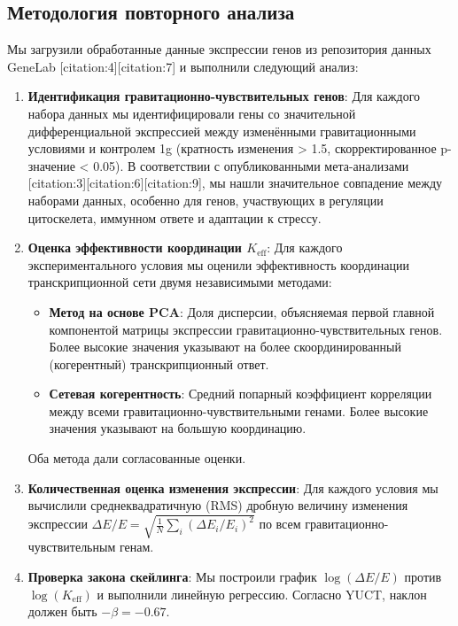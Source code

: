 \documentclass[12pt,a4paper]{article}
\theoremstyle{remark}
\newcommand{\Keff}{K_{\mathrm{eff}}}
\begin{document}
	\subsection{Методология повторного анализа}
	
	Мы загрузили обработанные данные экспрессии генов из репозитория данных GeneLab [citation:4][citation:7] и выполнили следующий анализ:
	
	\begin{enumerate}
		\item \textbf{Идентификация гравитационно-чувствительных генов}: Для каждого набора данных мы идентифицировали гены со значительной дифференциальной экспрессией между изменёнными гравитационными условиями и контролем 1g (кратность изменения > 1.5, скорректированное p-значение < 0.05). В соответствии с опубликованными мета-анализами [citation:3][citation:6][citation:9], мы нашли значительное совпадение между наборами данных, особенно для генов, участвующих в регуляции цитоскелета, иммунном ответе и адаптации к стрессу.
		
		\item \textbf{Оценка эффективности координации \(\Keff\)}: Для каждого экспериментального условия мы оценили эффективность координации транскрипционной сети двумя независимыми методами:
		\begin{itemize}
			\item \textbf{Метод на основе PCA}: Доля дисперсии, объясняемая первой главной компонентой матрицы экспрессии гравитационно-чувствительных генов. Более высокие значения указывают на более скоординированный (когерентный) транскрипционный ответ.
			\item \textbf{Сетевая когерентность}: Средний попарный коэффициент корреляции между всеми гравитационно-чувствительными генами. Более высокие значения указывают на большую координацию.
		\end{itemize}
		Оба метода дали согласованные оценки.
		
		\item \textbf{Количественная оценка изменения экспрессии}: Для каждого условия мы вычислили среднеквадратичную (RMS) дробную величину изменения экспрессии \(\Delta E/E = \sqrt{\frac{1}{N}\sum_i (\Delta E_i/E_i)^2}\) по всем гравитационно-чувствительным генам.
		
		\item \textbf{Проверка закона скейлинга}: Мы построили график \(\log(\Delta E/E)\) против \(\log(\Keff)\) и выполнили линейную регрессию. Согласно YUCT, наклон должен быть \(-\beta = -0.67\).
	\end{enumerate}
	
\end{document}
